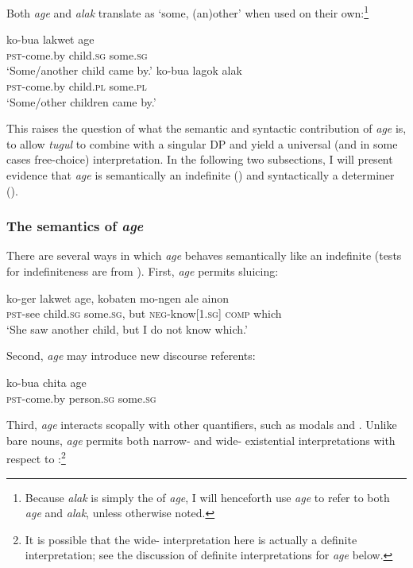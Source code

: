 \documentclass[output=paper,newtxmath,modfonts,nonflat,hidelinks]{langsci/langscibook}
\begin{document}
\noindent Both \textit{age} and \textit{alak} translate as ‘some, (an)other’ when used on their own:\footnote{Because \textit{alak} is simply the  of \textit{age}, I will henceforth use \textit{age} to refer to both \textit{age} and \textit{alak}, unless otherwise noted.}

\ea \label{ex:agealak}  
\ea
\gll ko-bua lakwet age\\
	   \textsc{pst}-come.by child.\textsc{sg} some.\textsc{sg}\\
  \glt ‘Some/another child came by.’
\ex 
\gll ko-bua lagok alak\\
	   \textsc{pst}-come.by child.\textsc{pl} some.\textsc{pl}\\
  \glt ‘Some/other children came by.’
  \z
\z

This raises the question of what the semantic and syntactic contribution of \textit{age} is, to allow \textit{tugul} to combine with a singular DP and yield a universal (and in some cases free-choice) interpretation. In the following two subsections, I will present evidence that \textit{age} is semantically an indefinite () and syntactically a determiner ().

\subsubsection{The semantics of \textit{age}}
\label{sec:landman:agesem}
There are several ways in which \textit{age} behaves semantically like an indefinite (tests for indefiniteness are from \citealt{Matthewson:1999}). First, \textit{age} permits sluicing:

\ea \label{ex:landman:sluicingage}
    \gll ko-ger lakwet age, kobaten mo-ngen ale ainon\\
         \textsc{pst}-see child.\textsc{sg} some.\textsc{sg}, but \textsc{neg}-know[1.\textsc{sg}] \textsc{comp} which\\
    \glt ‘She saw another child, but I do not know which.’
\z

 Second, \textit{age} may introduce new discourse referents:

\ea
  \gll ko-bua chita age\\
       \textsc{pst}-come.by person.\textsc{sg} some.\textsc{sg}\\
\z

 Third, \textit{age} interacts scopally with other quantifiers, such as modals and . Unlike bare nouns, \textit{age} permits both narrow- and wide- existential interpretations with respect to :\footnote{It is possible that the wide- interpretation here is actually a definite interpretation; see the discussion of definite interpretations for \textit{age} below.}
\end{document}
